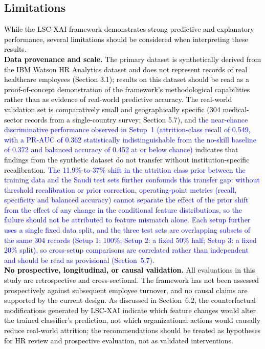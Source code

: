 \documentclass[a4paper,fleqn]{cas-sc}
\begin{document}
\subsection{Limitations}
\label{subsec:limilations}
\textcolor{black}{
While the LSC-XAI framework demonstrates strong predictive and explanatory performance, several limitations should be considered when interpreting these results.\\
\textbf{Data provenance and scale.} The primary dataset is synthetically derived from the IBM Watson HR Analytics dataset and does not represent records of real healthcare employees (Section 3.1); results on this dataset should be read as a proof-of-concept demonstration of the framework's methodological capabilities rather than as evidence of real-world predictive accuracy. The real-world validation set is comparatively small and geographically specific (304 medical-sector records from a single-country survey; Section 5.7), and \textcolor{blue}{the near-chance discriminative performance observed in Setup~1 (attrition-class recall of 0.549, with a PR-AUC of 0.362 statistically indistinguishable from the no-skill baseline of 0.372 and balanced accuracy of 0.452 at or below chance)} indicates that findings from the synthetic dataset do not transfer without institution-specific recalibration. \textcolor{blue}{The 11.9\%-to-37\% shift in the attrition class prior between the training data and the Saudi test sets further confounds this transfer gap: without threshold recalibration or prior correction, operating-point metrics (recall, specificity and balanced accuracy) cannot separate the effect of the prior shift from the effect of any change in the conditional feature distributions, so the failure should not be attributed to feature mismatch alone.} \textcolor{blue}{Each setup further uses a single fixed data split, and the three test sets are overlapping subsets of the same 304 records (Setup 1: 100\%; Setup 2: a fixed 50\% half; Setup 3: a fixed 20\% split), so cross-setup comparisons are correlated rather than independent and should be read as provisional (Section~5.7).}\\
\textbf{No prospective, longitudinal, or causal validation.} All evaluations in this study are retrospective and cross-sectional. The framework has not been assessed prospectively against subsequent employee turnover, and no causal claims are supported by the current design. As discussed in Section~6.2, the counterfactual modifications generated by LSC-XAI indicate which feature changes would alter the trained classifier's prediction, not which organizational actions would causally reduce real-world attrition; the recommendations should be treated as hypotheses for HR review and prospective evaluation, not as validated interventions.\\
}
\end{document}
